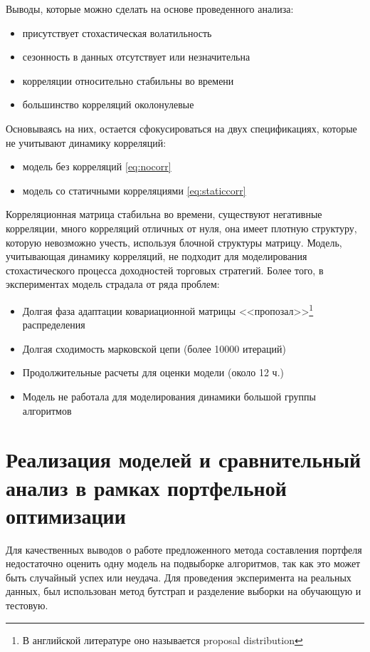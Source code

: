 Выводы, которые можно сделать на основе проведенного анализа:
\begin{itemize}
	\item присутствует стохастическая волатильность
	\item сезонность в данных отсутствует или незначительна
	\item корреляции относительно стабильны во времени
	\item большинство корреляций околонулевые
\end{itemize}

Основываясь на них, остается сфокусироваться на двух спецификациях, которые не учитывают динамику корреляций:
\begin{itemize}
	\item модель без корреляций \eqref{eq:nocorr}
	\item модель со статичными корреляциями \eqref{eq:staticcorr}
\end{itemize}

Корреляционная матрица стабильна во времени, существуют негативные корреляции, много корреляций отличных от нуля, она имеет плотную структуру, которую невозможно учесть, используя блочной структуры матрицу. Модель, учитывающая динамику корреляций, не подходит для моделирования стохастического процесса доходностей торговых стратегий. Более того, в экспериментах модель страдала от ряда проблем:
\begin{itemize}
	\item Долгая фаза адаптации ковариационной матрицы <<пропозал>>\footnote{В английской литературе оно называется proposal distribution} распределения
	\item Долгая сходимость марковской цепи (более 10000 итераций)
	\item Продолжительные расчеты для оценки модели (около 12 ч.)
	\item Модель не работала для моделирования динамики большой группы алгоритмов
\end{itemize}

\section{Реализация моделей и сравнительный анализ в рамках портфельной оптимизации}
Для качественных выводов о работе предложенного метода составления портфеля недостаточно оценить одну модель на подвыборке алгоритмов, так как это может быть случайный успех или неудача. Для проведения эксперимента на реальных данных, был использован метод бутстрап \citep{grimshaw1995} и разделение выборки на обучающую и тестовую.

